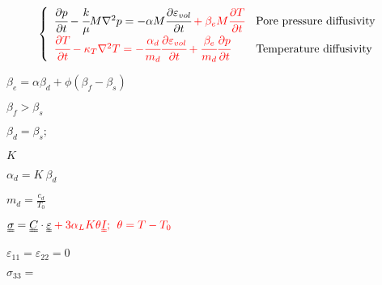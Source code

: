 \documentclass[onecolumn,11pt]{report}
\def\lthtmlcheckvsize{\ifdim\ht\sizebox<\vsize 
  \ifdim\wd\sizebox<\hsize\expandafter\hfill\fi \expandafter\vfill
  \else\expandafter\vss\fi}%
\begin{document}
{\newpage\clearpage
{}%
\begin{displaymath}\left\lbrace
\begin{array} {ll}
\cfrac{\partial p}{\partial t} - \cfrac{k}{\mu} M \nabla^2 p = - \alpha M \cfrac{\partial \varepsilon_{vol}}{\partial t} \color{red} + \beta_e M  \cfrac{\partial T}{\partial t} & \text{Pore pressure diffusivity}\\
\color{red} \cfrac{\partial T}{\partial t} - \kappa_T \nabla^2 T = -\cfrac{\alpha_d}{m_d} \cfrac{\partial \varepsilon_{vol}}{\partial t} + \cfrac{\beta_e}{m_d} \cfrac{\partial p}{\partial t} & \text{Temperature diffusivity}
\end{array}
\right.\end{displaymath}%
\lthtmldisplayZ
\lthtmlcheckvsize\clearpage}

{\newpage\clearpage
{}%
$\displaystyle \beta_e = \alpha \beta_d + \phi (\beta_f - \beta_s)$%
\lthtmlindisplaymathZ
\lthtmlcheckvsize\clearpage}

{\newpage\clearpage
{}%
$ \beta_f > \beta_s$%
\lthtmlindisplaymathZ
\lthtmlcheckvsize\clearpage}

{\newpage\clearpage
{}%
$\displaystyle \beta_d = \beta_s; \:$%
\lthtmlindisplaymathZ
\lthtmlcheckvsize\clearpage}

{\newpage\clearpage
{}%
$ K$%
\lthtmlindisplaymathZ
\lthtmlcheckvsize\clearpage}

{\newpage\clearpage
{}%
$\displaystyle \alpha_d = K \: \beta_d$%
\lthtmlindisplaymathZ
\lthtmlcheckvsize\clearpage}

{\newpage\clearpage
{}%
$\displaystyle m_d = \frac{c_d}{T_0}$%
\lthtmlindisplaymathZ
\lthtmlcheckvsize\clearpage}

{\newpage\clearpage
{}%
$\displaystyle \uuline{\sigma} = \uuline{C} \cdot \uuline{\varepsilon} \color{red} + 3 \alpha_L K \theta \uuline{I}; \:\: \theta = T - T_0$%
\lthtmlindisplaymathZ
\lthtmlcheckvsize\clearpage}

{\newpage\clearpage
{}%
$ \varepsilon_{11} = \varepsilon_{22} = 0$%
\lthtmlindisplaymathZ
\lthtmlcheckvsize\clearpage}

{\newpage\clearpage
{}%
$ \sigma_{33} = $%
\lthtmlindisplaymathZ
\lthtmlcheckvsize\clearpage}
\end{document}

